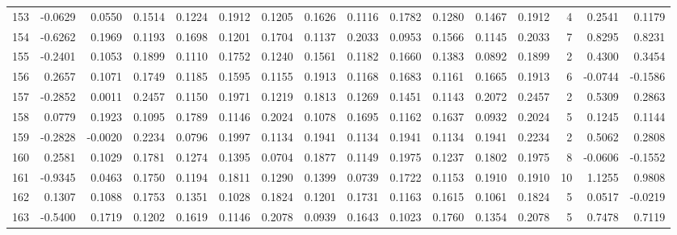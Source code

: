 \begin{tabular}{lrrrrrrrrrrrrrrr}
153 &     -0.0629 &  0.0550 &  0.1514 &  0.1224 &  0.1912 &  0.1205 &  0.1626 &  0.1116 &  0.1782 &  0.1280 &   0.1467 &     0.1912 &      4 &                    0.2541 &                     0.1179 \\
154 &     -0.6262 &  0.1969 &  0.1193 &  0.1698 &  0.1201 &  0.1704 &  0.1137 &  0.2033 &  0.0953 &  0.1566 &   0.1145 &     0.2033 &      7 &                    0.8295 &                     0.8231 \\
155 &     -0.2401 &  0.1053 &  0.1899 &  0.1110 &  0.1752 &  0.1240 &  0.1561 &  0.1182 &  0.1660 &  0.1383 &   0.0892 &     0.1899 &      2 &                    0.4300 &                     0.3454 \\
156 &      0.2657 &  0.1071 &  0.1749 &  0.1185 &  0.1595 &  0.1155 &  0.1913 &  0.1168 &  0.1683 &  0.1161 &   0.1665 &     0.1913 &      6 &                   -0.0744 &                    -0.1586 \\
157 &     -0.2852 &  0.0011 &  0.2457 &  0.1150 &  0.1971 &  0.1219 &  0.1813 &  0.1269 &  0.1451 &  0.1143 &   0.2072 &     0.2457 &      2 &                    0.5309 &                     0.2863 \\
158 &      0.0779 &  0.1923 &  0.1095 &  0.1789 &  0.1146 &  0.2024 &  0.1078 &  0.1695 &  0.1162 &  0.1637 &   0.0932 &     0.2024 &      5 &                    0.1245 &                     0.1144 \\
159 &     -0.2828 & -0.0020 &  0.2234 &  0.0796 &  0.1997 &  0.1134 &  0.1941 &  0.1134 &  0.1941 &  0.1134 &   0.1941 &     0.2234 &      2 &                    0.5062 &                     0.2808 \\
160 &      0.2581 &  0.1029 &  0.1781 &  0.1274 &  0.1395 &  0.0704 &  0.1877 &  0.1149 &  0.1975 &  0.1237 &   0.1802 &     0.1975 &      8 &                   -0.0606 &                    -0.1552 \\
161 &     -0.9345 &  0.0463 &  0.1750 &  0.1194 &  0.1811 &  0.1290 &  0.1399 &  0.0739 &  0.1722 &  0.1153 &   0.1910 &     0.1910 &     10 &                    1.1255 &                     0.9808 \\
162 &      0.1307 &  0.1088 &  0.1753 &  0.1351 &  0.1028 &  0.1824 &  0.1201 &  0.1731 &  0.1163 &  0.1615 &   0.1061 &     0.1824 &      5 &                    0.0517 &                    -0.0219 \\
163 &     -0.5400 &  0.1719 &  0.1202 &  0.1619 &  0.1146 &  0.2078 &  0.0939 &  0.1643 &  0.1023 &  0.1760 &   0.1354 &     0.2078 &      5 &                    0.7478 &                     0.7119 \\

\end{tabular}
